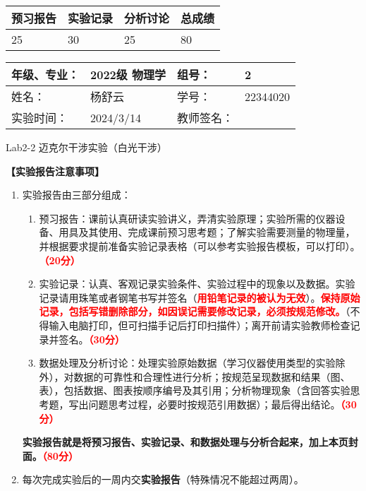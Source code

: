 \documentclass[dvipsnames, svgnames,a4paper,11pt]{article}
\begin{document}
	
	
	
	
	\begin{table}
		\renewcommand\arraystretch{1.7}
		\begin{tabularx}{\textwidth}{
				|X|X|X|X
				|X|X|X|X|}
			\hline
			\multicolumn{2}{|c|}{预习报告}&\multicolumn{2}{|c|}{实验记录}&\multicolumn{2}{|c|}{分析讨论}&\multicolumn{2}{|c|}{总成绩}\\
			\hline
			\LARGE25 & & \LARGE30 & & \LARGE25 & & \LARGE80 & \\
			\hline
		\end{tabularx}
	\end{table}
	
	\begin{table}
		\renewcommand\arraystretch{1.7}
		\begin{tabularx}{\textwidth}{|X|X|X|X|}
			\hline
			年级、专业： & 2022级 物理学 &组号： & 2\\
			\hline
			姓名： & 杨舒云  & 学号： & 22344020\\
			\hline
			实验时间： & 2024/3/14 & 教师签名： & \\
			\hline
		\end{tabularx}
	\end{table}
	
	\begin{center}
		\LARGE Lab2-2 \quad 迈克尔干涉实验（白光干涉）
	\end{center}
	
	
	\textbf{【实验报告注意事项】}
	\begin{enumerate}
		\item 实验报告由三部分组成：
		\begin{enumerate}
			\item 预习报告：课前认真研读实验讲义，弄清实验原理；实验所需的仪器设备、用具及其使用、完成课前预习思考题；了解实验需要测量的物理量，并根据要求提前准备实验记录表格（可以参考实验报告模板，可以打印）。\textcolor{red}{\textbf{（20分）}}
			\item 实验记录：认真、客观记录实验条件、实验过程中的现象以及数据。实验记录请用珠笔或者钢笔书写并签名（\textcolor{red}{\textbf{用铅笔记录的被认为无效}}）。\textcolor{red}{\textbf{保持原始记录，包括写错删除部分，如因误记需要修改记录，必须按规范修改。}}（不得输入电脑打印，但可扫描手记后打印扫描件）；离开前请实验教师检查记录并签名。\textcolor{red}{\textbf{（30分）}}
			\item 数据处理及分析讨论：处理实验原始数据（学习仪器使用类型的实验除外），对数据的可靠性和合理性进行分析；按规范呈现数据和结果（图、表），包括数据、图表按顺序编号及其引用；分析物理现象（含回答实验思考题，写出问题思考过程，必要时按规范引用数据）；最后得出结论。\textcolor{red}{\textbf{（30分）}}
		\end{enumerate}
		\textbf{实验报告就是将预习报告、实验记录、和数据处理与分析合起来，加上本页封面。\textcolor{red}{（80分）}}
		\item 每次完成实验后的一周内交\textbf{实验报告}（特殊情况不能超过两周）。
	\end{enumerate}
	
\end{document}
